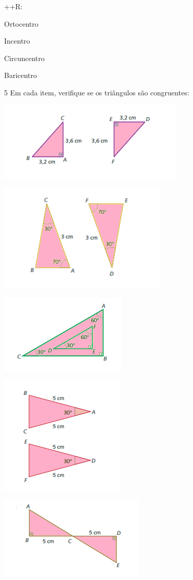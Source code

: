 {++R:
\item Ortocentro
\item Incentro
\item Circuncentro
\item Baricentro

\num{5} Em cada item, verifique se os triângulos são congruentes:
\item
\includegraphics[width=3.51042in,height=1.48958in]{./imgSAEB_8_MAT/media/image19.png}
\item
\includegraphics[width=3.16667in,height=2.03958in]{./imgSAEB_8_MAT/media/image20.png}
\item
\includegraphics[width=2.38542in,height=1.47917in]{./imgSAEB_8_MAT/media/image21.png}
\item
\includegraphics[width=2.35417in,height=2.23958in]{./imgSAEB_8_MAT/media/image22.png}
\item
\includegraphics[width=2.73958in,height=1.54167in]{./imgSAEB_8_MAT/media/image23.png}

}
